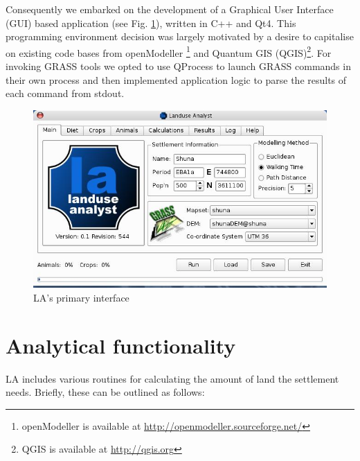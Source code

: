 Consequently we embarked on the development of a Graphical User Interface (GUI)
based application (see Fig. \ref{fig:la544}), written in C++ and Qt4. This
programming environment decision was largely motivated by a desire to
capitalise on existing code bases from openModeller \footnote{openModeller is
available at \url{http://openmodeller.sourceforge.net/}} and Quantum GIS
(QGIS)\footnote{QGIS is available at \url{http://qgis.org}}.  For invoking
GRASS tools we opted to use QProcess to launch GRASS commands in their own
process and then implemented application logic to parse the results of each
command from stdout.

\begin{figure}[htbp] %
  \includegraphics[scale=0.36]{./images/LanduseAnalyst544.jpg}
    \caption{\label{fig:la544}LA's primary interface}
   \end{figure}


\section{Analytical functionality} \label{sec:Analytical Functionality}

LA includes various routines for calculating the amount of land 
the settlement needs.  Briefly, these can be outlined as follows:

